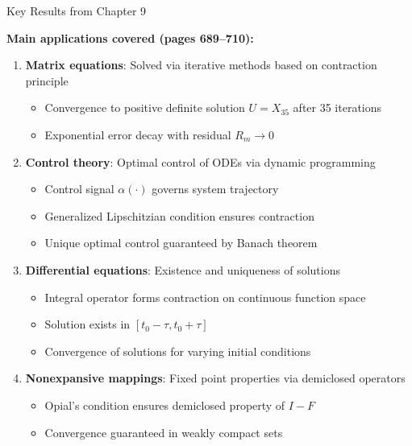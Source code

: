 \documentclass[aspectratio=169,10pt]{beamer}
\begin{document}
\begin{frame}[allowframebreaks]{Key Results from Chapter 9}

\textbf{Main applications covered (pages 689--710):}

\begin{enumerate}
  \item \textbf{Matrix equations}: Solved via iterative methods based on contraction principle
  \begin{itemize}
    \item Convergence to positive definite solution $U = X_{35}$ after 35 iterations
    \item Exponential error decay with residual $R_m \to 0$
  \end{itemize}

  \item \textbf{Control theory}: Optimal control of ODEs via dynamic programming
  \begin{itemize}
    \item Control signal $\alpha(\cdot)$ governs system trajectory
    \item Generalized Lipschitzian condition ensures contraction
    \item Unique optimal control guaranteed by Banach theorem
  \end{itemize}

  \item \textbf{Differential equations}: Existence and uniqueness of solutions
  \begin{itemize}
    \item Integral operator forms contraction on continuous function space
    \item Solution exists in $[t_0 - \tau, t_0 + \tau]$
    \item Convergence of solutions for varying initial conditions
  \end{itemize}

  \item \textbf{Nonexpansive mappings}: Fixed point properties via demiclosed operators
  \begin{itemize}
    \item Opial's condition ensures demiclosed property of $I - F$
    \item Convergence guaranteed in weakly compact sets
  \end{itemize}
\end{enumerate}

\end{frame}
\end{document}

